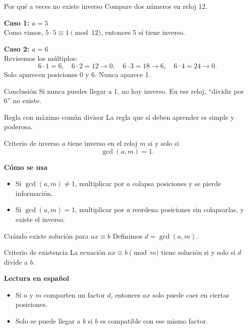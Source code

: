 \documentclass[aspectratio=1610, 9pt]{beamer}
\begin{document}
\begin{frame}{Por qué a veces no existe inverso}
    Compare dos números en reloj 12.

    \vspace{0.25cm}
    \textbf{Caso 1: $a=5$}\\
    Como vimos, $5\cdot 5 \equiv 1 \pmod{12}$, entonces 5 sí tiene inverso.

    \vspace{0.35cm}
    \textbf{Caso 2: $a=6$}\\
    Revisemos los múltiplos:
    \[
    6\cdot 1=6,\quad 6\cdot 2=12\rightarrow 0,\quad
    6\cdot 3=18\rightarrow 6,\quad 6\cdot 4=24\rightarrow 0.
    \]
    Solo aparecen posiciones 0 y 6. Nunca aparece 1.

    \vspace{0.3cm}
    \begin{alertblock}{Conclusión}
    Si nunca puedes llegar a 1, no hay inverso. En ese reloj, ``dividir por 6'' no existe.
    \end{alertblock}
\end{frame}

\begin{frame}{Regla con máximo común divisor}
    La regla que sí deben aprender es simple y poderosa.

    \vspace{0.35cm}
    \begin{block}{Criterio de inverso}
    $a$ tiene inverso en el reloj $m$ si y solo si
    \[
    \gcd(a,m)=1.
    \]
    \end{block}

    \vspace{0.25cm}
    \textbf{Cómo se usa}
    \begin{itemize}
        \item Si $\gcd(a,m)\neq 1$, multiplicar por $a$ colapsa posiciones y se pierde información.
        \item Si $\gcd(a,m)=1$, multiplicar por $a$ reordena posiciones sin colapsarlas, y existe el inverso.
    \end{itemize}
\end{frame}

\begin{frame}{Cuándo existe solución para $ax\equiv b$}
    Definimos $d=\gcd(a,m)$.

    \vspace{0.35cm}
    \begin{block}{Criterio de existencia}
    La ecuación $ax \equiv b \pmod m$ tiene solución si y solo si $d$ divide a $b$.
    \end{block}

    \vspace{0.25cm}
    \textbf{Lectura en español}
    \begin{itemize}
        \item Si $a$ y $m$ comparten un factor $d$, entonces $ax$ solo puede caer en ciertas posiciones.
        \item Solo se puede llegar a $b$ si $b$ es compatible con ese mismo factor.
    \end{itemize}
\end{frame}
\end{document}
